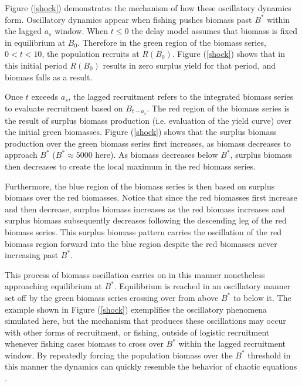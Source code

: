 %
\clearpage

%
Figure (\ref{shock}) demonstrates the mechanism of how these oscillatory
dynamics form. Oscillatory dynamics appear when fishing pushes biomass past
$B^*$ within the lagged $a_s$ window. %
When $t\le0$ the delay model assumes that biomass is fixed in equilibrium at $B_0$. 
Therefore in the green region of the biomass series, $0<t<10$, the population recruits 
at $R(B_0)$. Figure (\ref{shock}) shows that in this initial period $R(B_0)$ results in 
zero surplus yield for that period, and biomass falls as a result.

%
Once $t$ exceeds $a_s$, the lagged recruitment refers to the integrated
biomass series to evaluate recruitment based on $B_{t-a_s}$. The red
region of the biomass series is the result of surplus biomass production 
(i.e. evaluation of the yield curve) %
over the initial green biomasses. Figure (\ref{shock}) shows that the %
surplus biomass production over the green biomass series first increases, 
as biomass decreases to approach $B^*$ ($B^*\approx5000$ here). As biomass 
decreases below $B^*$, surplus biomass then decreases to create
the local maximum in the red biomass series.

%
Furthermore, the blue region of the biomass series is then based on surplus biomass %
over the red biomasses. Notice that since the red biomasses first increase and
then decrease, surplus biomass %
increases as the red biomass increases and surplus biomass subsequently decreases  %
following the descending leg of the red biomass series. This %
surplus biomass pattern carries the oscillation of the red biomass region
forward into the blue region despite the red biomasses never increasing past $B^*$. 

%
This process of biomass oscillation carries on in this manner nonetheless
approaching equilibrium at $B^*$. Equilibrium is reached in an oscillatory
manner set off by the green biomass series crossing over from above $B^*$
to below it. The example shown in Figure (\ref{shock}) exemplifies the oscillatory 
phenomena simulated here, but the mechanism that produces these oscillations may
occur with other forms of recruitment, or fishing, outside of logistic recruitment 
whenever fishing cases biomass to cross over $B^*$ within the lagged recruitment 
window. By repeatedly forcing the population biomass over the $B^*$ threshold in 
this manner the dynamics can quickly resemble the behavior of chaotic equations \cite{ausloos_logistic_2006, sprott_simple_2007}. %

